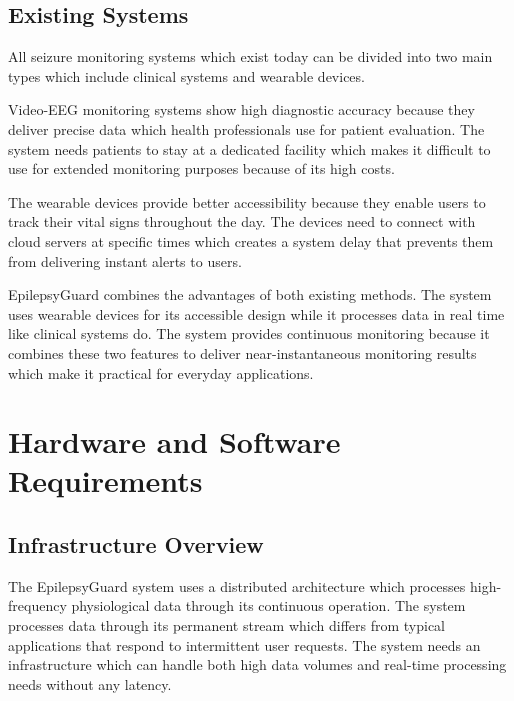 \documentclass[12pt, a4paper, oneside]{report}
\newcommand{\chapterpage}[2]{%
    \cleardoublepage
    \thispagestyle{empty}
    \vspace*{\fill}
    \begin{center}
        \huge \textbf{Chapter #1} \\
        \vspace{1cm}
        \Huge #2
    \end{center}
    \vspace*{\fill}
    \newpage
}
\begin{document}
\section{Existing Systems}

All seizure monitoring systems which exist today can be divided into two main types which include clinical systems and wearable devices.

Video-EEG monitoring systems show high diagnostic accuracy because they deliver precise data which health professionals use for patient evaluation. The system needs patients to stay at a dedicated facility which makes it difficult to use for extended monitoring purposes because of its high costs.

The wearable devices provide better accessibility because they enable users to track their vital signs throughout the day. The devices need to connect with cloud servers at specific times which creates a system delay that prevents them from delivering instant alerts to users.

EpilepsyGuard combines the advantages of both existing methods. The system uses wearable devices for its accessible design while it processes data in real time like clinical systems do. The system provides continuous monitoring because it combines these two features to deliver near-instantaneous monitoring results which make it practical for everyday applications.


\chapter{Hardware and Software Requirements}

\section{Infrastructure Overview}

The EpilepsyGuard system uses a distributed architecture which processes high-frequency physiological data through its continuous operation. The system processes data through its permanent stream which differs from typical applications that respond to intermittent user requests. The system needs an infrastructure which can handle both high data volumes and real-time processing needs without any latency. 
\end{document}
